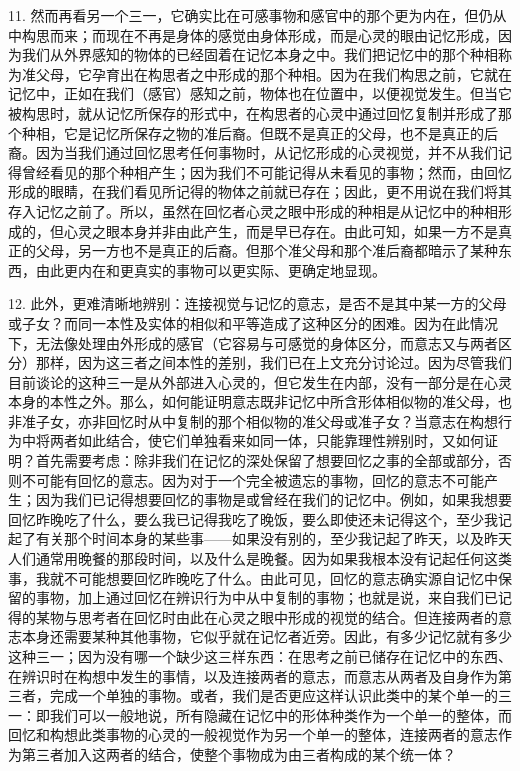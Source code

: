 11. 然而再看另一个三一，它确实比在可感事物和感官中的那个更为内在，但仍从中构思而来；而现在不再是身体的感觉由身体形成，而是心灵的眼由记忆形成，因为我们从外界感知的物体的已经固着在记忆本身之中。我们把记忆中的那个种相称为准父母，它孕育出在构思者之中形成的那个种相。因为在我们构思之前，它就在记忆中，正如在我们（感官）感知之前，物体也在位置中，以便视觉发生。但当它被构思时，就从记忆所保存的形式中，在构思者的心灵中通过回忆复制并形成了那个种相，它是记忆所保存之物的准后裔。但既不是真正的父母，也不是真正的后裔。因为当我们通过回忆思考任何事物时，从记忆形成的心灵视觉，并不从我们记得曾经看见的那个种相产生；因为我们不可能记得从未看见的事物；然而，由回忆形成的眼睛，在我们看见所记得的物体之前就已存在；因此，更不用说在我们将其存入记忆之前了。所以，虽然在回忆者心灵之眼中形成的种相是从记忆中的种相形成的，但心灵之眼本身并非由此产生，而是早已存在。由此可知，如果一方不是真正的父母，另一方也不是真正的后裔。但那个准父母和那个准后裔都暗示了某种东西，由此更内在和更真实的事物可以更实际、更确定地显现。\par

12. 此外，更难清晰地辨别：连接视觉与记忆的意志，是否不是其中某一方的父母或子女？而同一本性及实体的相似和平等造成了这种区分的困难。因为在此情况下，无法像处理由外形成的感官（它容易与可感觉的身体区分，而意志又与两者区分）那样，因为这三者之间本性的差别，我们已在上文充分讨论过。因为尽管我们目前谈论的这种三一是从外部进入心灵的，但它发生在内部，没有一部分是在心灵本身的本性之外。那么，如何能证明意志既非记忆中所含形体相似物的准父母，也非准子女，亦非回忆时从中复制的那个相似物的准父母或准子女？当意志在构想行为中将两者如此结合，使它们单独看来如同一体，只能靠理性辨别时，又如何证明？首先需要考虑：除非我们在记忆的深处保留了想要回忆之事的全部或部分，否则不可能有回忆的意志。因为对于一个完全被遗忘的事物，回忆的意志不可能产生；因为我们已记得想要回忆的事物是或曾经在我们的记忆中。例如，如果我想要回忆昨晚吃了什么，要么我已记得我吃了晚饭，要么即使还未记得这个，至少我记起了有关那个时间本身的某些事——如果没有别的，至少我记起了昨天，以及昨天人们通常用晚餐的那段时间，以及什么是晚餐。因为如果我根本没有记起任何这类事，我就不可能想要回忆昨晚吃了什么。由此可见，回忆的意志确实源自记忆中保留的事物，加上通过回忆在辨识行为中从中复制的事物；也就是说，来自我们已记得的某物与思考者在回忆时由此在心灵之眼中形成的视觉的结合。但连接两者的意志本身还需要某种其他事物，它似乎就在记忆者近旁。因此，有多少记忆就有多少这种三一；因为没有哪一个缺少这三样东西：在思考之前已储存在记忆中的东西、在辨识时在构想中发生的事情，以及连接两者的意志，而意志从两者及自身作为第三者，完成一个单独的事物。或者，我们是否更应这样认识此类中的某个单一的三一：即我们可以一般地说，所有隐藏在记忆中的形体种类作为一个单一的整体，而回忆和构想此类事物的心灵的一般视觉作为另一个单一的整体，连接两者的意志作为第三者加入这两者的结合，使整个事物成为由三者构成的某个统一体？\par

